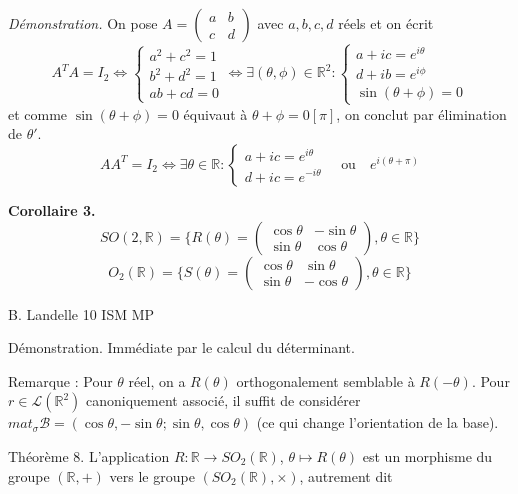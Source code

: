\textit{Démonstration.} On pose $A = \begin{pmatrix} a & b \\ c & d \end{pmatrix}$ avec $a, b, c, d$ réels et on écrit
\[
A^T A = I_2 \iff
\begin{cases}
a^2 + c^2 = 1 \\
b^2 + d^2 = 1 \\
ab + cd = 0
\end{cases}
\iff \exists (\theta, \phi) \in \mathbb{R}^2 :
\begin{cases}
a + ic = e^{i\theta} \\
d + ib = e^{i\phi} \\
\sin(\theta + \phi) = 0
\end{cases}
\]
et comme $\sin(\theta + \phi) = 0$ équivaut à $\theta + \phi = 0 [\pi]$, on conclut par élimination de $\theta'$.\[
A A^T = I_2 \iff \exists \theta \in \mathbb{R} :
\begin{cases}
a + ic = e^{i\theta} \\
d + ic = e^{-i\theta}
\end{cases}
\quad \text{ou} \quad
e^{i(\theta+\pi)}
\]

\textbf{Corollaire 3.}
\[
SO(2,\mathbb{R}) = \{R(\theta) = \begin{pmatrix}
\cos \theta & -\sin \theta \\
\sin \theta & \cos \theta
\end{pmatrix}, \theta \in \mathbb{R}\}
\]
\[
O_2(\mathbb{R}) = \{S(\theta) = \begin{pmatrix}
\cos \theta & \sin \theta \\
\sin \theta & -\cos \theta
\end{pmatrix}, \theta \in \mathbb{R}\}
\]

B. Landelle \hfill 10 \hfill ISM MP


Démonstration. Immédiate par le calcul du déterminant.

Remarque : Pour $\theta$ réel, on a $R(\theta)$ orthogonalement semblable à $R(-\theta)$. Pour $r \in \mathcal{L}(\mathbb{R}^2)$ canoniquement associé, il suffit de considérer $mat_{\sigma} \mathcal{B} = (\cos \theta, -\sin \theta; \sin \theta, \cos \theta)$ (ce qui change l'orientation de la base).

Théorème 8. L'application $R : \mathbb{R} \rightarrow SO_2(\mathbb{R})$, $\theta \mapsto R(\theta)$ est un morphisme du groupe $(\mathbb{R}, +)$ vers le groupe $(SO_2(\mathbb{R}), \times)$, autrement dit

